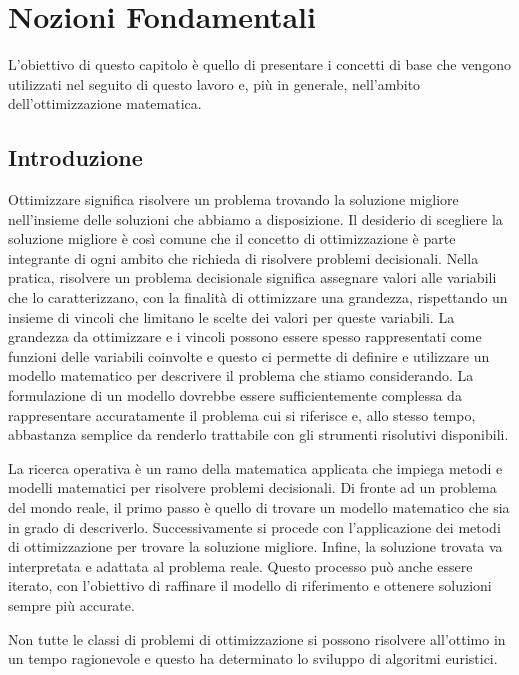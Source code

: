 \chapter{Nozioni Fondamentali}
L'obiettivo di questo capitolo è quello di presentare i concetti di base
che vengono utilizzati nel seguito di questo lavoro e, più in generale,
nell'ambito dell'ottimizzazione matematica.

\section{Introduzione}
Ottimizzare significa risolvere un problema trovando la soluzione migliore
nell'insieme delle soluzioni che abbiamo a disposizione. Il desiderio di
scegliere la soluzione migliore è così comune che il concetto di
ottimizzazione è parte integrante di ogni ambito che richieda di risolvere
problemi decisionali. Nella pratica, risolvere un problema decisionale
significa assegnare valori alle variabili che lo caratterizzano, con
la finalità di ottimizzare una grandezza, rispettando un insieme di
vincoli che limitano le scelte dei valori per queste variabili. La
grandezza da ottimizzare e i vincoli possono essere spesso
rappresentati come funzioni delle variabili coinvolte e questo ci permette
di definire e utilizzare un modello matematico per descrivere il problema che stiamo
considerando. La formulazione di un modello dovrebbe essere
sufficientemente complessa da rappresentare accuratamente il problema cui
si riferisce e, allo stesso tempo, abbastanza semplice da renderlo
trattabile con gli strumenti risolutivi disponibili.

La ricerca operativa è un ramo della matematica applicata che impiega
metodi e modelli matematici per risolvere problemi decisionali. Di fronte
ad un problema del mondo reale, il primo passo è quello di trovare un modello
matematico che sia in grado di descriverlo. Successivamente si procede con
l'applicazione dei metodi di ottimizzazione per trovare la soluzione
migliore. Infine, la soluzione trovata va interpretata e adattata al
problema reale. Questo processo può anche essere iterato, con l'obiettivo di
raffinare il modello di riferimento e ottenere
soluzioni sempre più accurate.

Non tutte le classi di problemi di ottimizzazione si possono risolvere
all'ottimo in un tempo ragionevole e questo ha determinato lo sviluppo di
algoritmi euristici.

